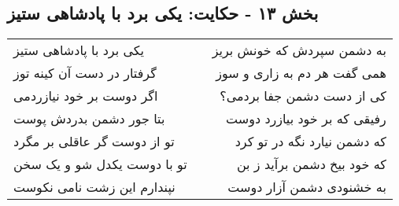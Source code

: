 \begin{center}
\section*{بخش ۱۳ - حکایت: یکی برد با پادشاهی ستیز}
\label{sec:013}
\begin{longtable}{l p{0.5cm} r}
یکی برد با پادشاهی ستیز
&&
به دشمن سپردش که خونش بریز
\\
گرفتار در دست آن کینه توز
&&
همی گفت هر دم به زاری و سوز
\\
اگر دوست بر خود نیازردمی
&&
کی از دست دشمن جفا بردمی؟
\\
بتا جور دشمن بدردش پوست
&&
رفیقی که بر خود بیازرد دوست
\\
تو از دوست گر عاقلی بر مگرد
&&
که دشمن نیارد نگه در تو کرد
\\
تو با دوست یکدل شو و یک سخن
&&
که خود بیخ دشمن برآید ز بن
\\
نپندارم این زشت نامی نکوست
&&
به خشنودی دشمن آزار دوست
\\
\end{longtable}
\end{center}
